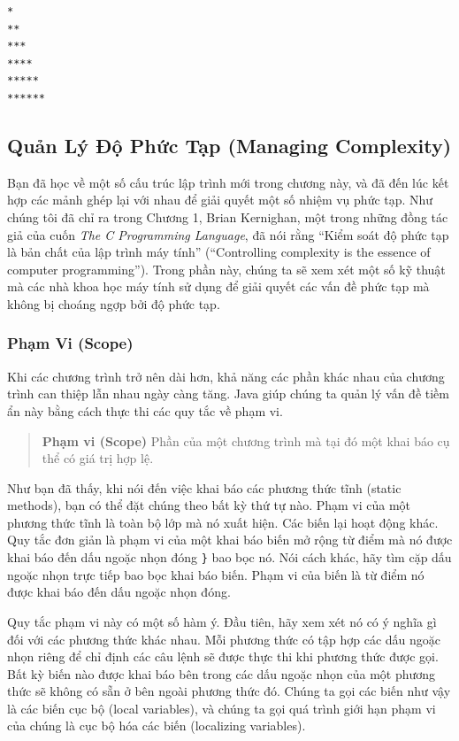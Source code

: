 \begin{verbatim}
* 
** 
*** 
**** 
***** 
******
\end{verbatim}

\subsection{Quản Lý Độ Phức Tạp (Managing
Complexity)}\label{quux1ea3n-luxfd-ux111ux1ed9-phux1ee9c-tux1ea1p-managing-complexity}

Bạn đã học về một số cấu trúc lập trình mới trong chương này, và đã đến
lúc kết hợp các mảnh ghép lại với nhau để giải quyết một số nhiệm vụ
phức tạp. Như chúng tôi đã chỉ ra trong Chương 1, Brian Kernighan, một
trong những đồng tác giả của cuốn \emph{The C Programming Language}, đã
nói rằng ``Kiểm soát độ phức tạp là bản chất của lập trình máy tính''
(``Controlling complexity is the essence of computer programming'').
Trong phần này, chúng ta sẽ xem xét một số kỹ thuật mà các nhà khoa học
máy tính sử dụng để giải quyết các vấn đề phức tạp mà không bị choáng
ngợp bởi độ phức tạp.

\subsubsection{Phạm Vi (Scope)}\label{phux1ea1m-vi-scope}

Khi các chương trình trở nên dài hơn, khả năng các phần khác nhau của
chương trình can thiệp lẫn nhau ngày càng tăng. Java giúp chúng ta quản
lý vấn đề tiềm ẩn này bằng cách thực thi các quy tắc về phạm vi.

\begin{quote}
\textbf{Phạm vi (Scope)} Phần của một chương trình mà tại đó một khai
báo cụ thể có giá trị hợp lệ.
\end{quote}

Như bạn đã thấy, khi nói đến việc khai báo các phương thức tĩnh (static
methods), bạn có thể đặt chúng theo bất kỳ thứ tự nào. Phạm vi của một
phương thức tĩnh là toàn bộ lớp mà nó xuất hiện. Các biến lại hoạt động
khác. Quy tắc đơn giản là phạm vi của một khai báo biến mở rộng từ điểm
mà nó được khai báo đến dấu ngoặc nhọn đóng \texttt{\}} bao bọc nó. Nói
cách khác, hãy tìm cặp dấu ngoặc nhọn trực tiếp bao bọc khai báo biến.
Phạm vi của biến là từ điểm nó được khai báo đến dấu ngoặc nhọn đóng.

Quy tắc phạm vi này có một số hàm ý. Đầu tiên, hãy xem xét nó có ý nghĩa
gì đối với các phương thức khác nhau. Mỗi phương thức có tập hợp các dấu
ngoặc nhọn riêng để chỉ định các câu lệnh sẽ được thực thi khi phương
thức được gọi. Bất kỳ biến nào được khai báo bên trong các dấu ngoặc
nhọn của một phương thức sẽ không có sẵn ở bên ngoài phương thức đó.
Chúng ta gọi các biến như vậy là các biến cục bộ (local variables), và
chúng ta gọi quá trình giới hạn phạm vi của chúng là cục bộ hóa các biến
(localizing variables).


